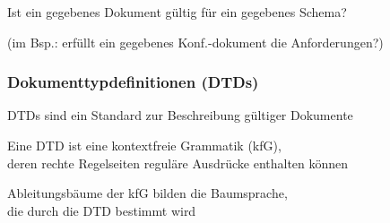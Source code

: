 \begin{frame}
      \par\bigskip
      \par\smallskip
      Ist ein gegebenes Dokument gültig für ein gegebenes Schema?
      \par\smallskip
      \begin{small}
        (im Bsp.: erfüllt ein gegebenes Konf.-dokument die Anforderungen?)
        \par
      \end{small}

      \par\bigskip

      \par\bigskip

    \end{frame}

    \begin{frame}
      \frametitle{Dokumenttypdefinitionen (DTDs)}

      DTDs sind ein Standard zur Beschreibung gültiger Dokumente

      \par\bigskip
      Eine DTD ist eine kontextfreie Grammatik (kfG),\\
      deren rechte Regelseiten reguläre Ausdrücke enthalten können

      \par\bigskip
      Ableitungsbäume der kfG bilden die Baumsprache,\\
      die durch die DTD bestimmt wird

    \end{frame}

